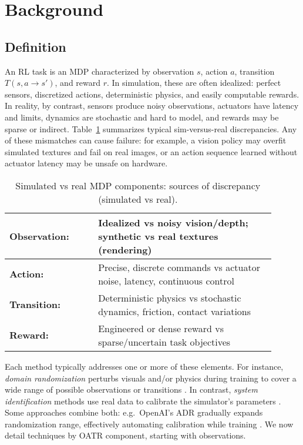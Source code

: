\section{Background}
\subsection{Definition}
An RL task is an MDP characterized by observation $s$, action $a$, transition $T(s,a\to s')$, and reward $r$. In simulation, these are often idealized: perfect sensors, discretized actions, deterministic physics, and easily computable rewards. In reality, by contrast, sensors produce noisy observations, actuators have latency and limits, dynamics are stochastic and hard to model, and rewards may be sparse or indirect. Table~\ref{tab:elements} summarizes typical sim-versus-real discrepancies. Any of these mismatches can cause failure: for example, a vision policy may overfit simulated textures and fail on real images, or an action sequence learned without actuator latency may be unsafe on hardware.

\begin{table}[htbp]
    \centering
    \caption{Simulated vs real MDP components: sources of discrepancy (simulated vs real).}
    \begin{tabular}{p{0.3\linewidth}p{0.6\linewidth}}
        \toprule
        \textbf{Observation:} & Idealized vs noisy vision/depth; synthetic vs real textures (rendering) \\
        \midrule
        \textbf{Action:} & Precise, discrete commands vs actuator noise, latency, continuous control \\
        \midrule
        \textbf{Transition:} & Deterministic physics vs stochastic dynamics, friction, contact variations \\
        \midrule
        \textbf{Reward:} & Engineered or dense reward vs sparse/uncertain task objectives \\
        \bottomrule
    \end{tabular}
    \label{tab:elements}
\end{table}

Each \simtoreal method typically addresses one or more of these elements. For instance, \emph{domain randomization} perturbs visuals and/or physics during training to cover a wide range of possible observations or transitions {\cite{Tobin2017,Sadeghi2017}}. In contrast, \emph{system identification} methods use real data to calibrate the simulator’s parameters {\cite{Chebotar2019}}. Some approaches combine both: e.g.\ OpenAI’s ADR gradually expands randomization range, effectively automating calibration while training {\cite{Akkaya2019}}. We now detail techniques by OATR component, starting with observations.